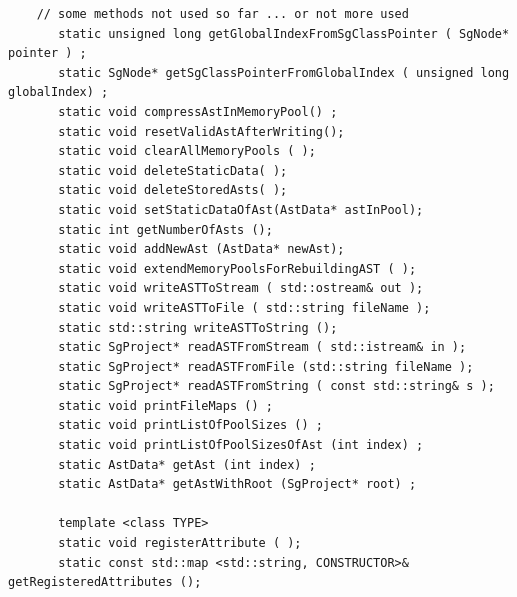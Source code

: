 \begin{enumerate}
\begin{lstlisting}
    // some methods not used so far ... or not more used   
       static unsigned long getGlobalIndexFromSgClassPointer ( SgNode* pointer ) ;
       static SgNode* getSgClassPointerFromGlobalIndex ( unsigned long globalIndex) ;
       static void compressAstInMemoryPool() ;
       static void resetValidAstAfterWriting();
       static void clearAllMemoryPools ( );
       static void deleteStaticData( );
       static void deleteStoredAsts( );
       static void setStaticDataOfAst(AstData* astInPool);
       static int getNumberOfAsts ();
       static void addNewAst (AstData* newAst);
       static void extendMemoryPoolsForRebuildingAST ( );
       static void writeASTToStream ( std::ostream& out );
       static void writeASTToFile ( std::string fileName );
       static std::string writeASTToString ();
       static SgProject* readASTFromStream ( std::istream& in );
       static SgProject* readASTFromFile (std::string fileName );
       static SgProject* readASTFromString ( const std::string& s );
       static void printFileMaps () ;
       static void printListOfPoolSizes () ;
       static void printListOfPoolSizesOfAst (int index) ;
       static AstData* getAst (int index) ;
       static AstData* getAstWithRoot (SgProject* root) ;

       template <class TYPE>
       static void registerAttribute ( ); 
       static const std::map <std::string, CONSTRUCTOR>& getRegisteredAttributes ();

         \end{lstlisting}

\end{enumerate}

